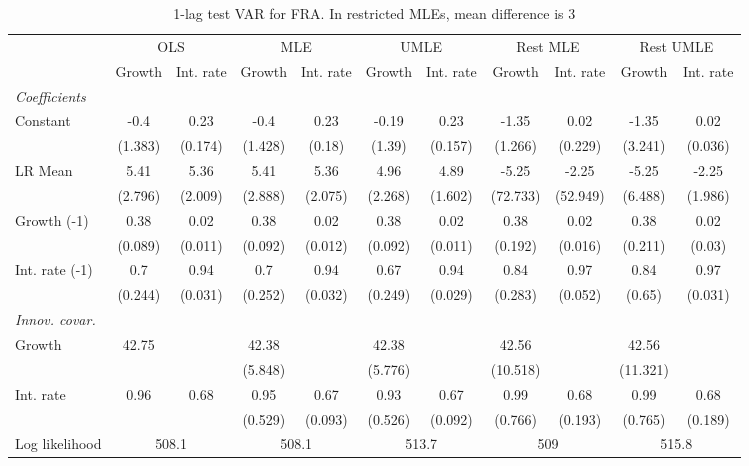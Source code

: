 \begin{table}[htbp] 
	\centering
	\begin{tabular}{@{\extracolsep{4pt}}lcccccccccc@{}}		\hline\hline
		 		 & \multicolumn{2}{c}{OLS} &\multicolumn{2}{c}{MLE} &\multicolumn{2}{c}{UMLE} &\multicolumn{2}{c}{Rest MLE} &\multicolumn{2}{c}{Rest UMLE} \\ 
 		 & Growth 	 & Int. rate 	 & Growth 	 & Int. rate 	 & Growth 	 & Int. rate 	 & Growth 	 & Int. rate 	 & Growth 	 & Int. rate\\\cline{2-3}\cline{4-5}\cline{6-7}\cline{8-9}\cline{10-11}
\rule{0pt}{4ex} 
 \emph{Coefficients} 	  		 & 		 & 		 & 		 & 		 & 		 & 		 & 		 & 		 & 		 &\\ 
\quad Constant 	 & -0.4 	 & 0.23 	 & -0.4 	 & 0.23 	 & -0.19 	 & 0.23 	 & -1.35 	 & 0.02 	 & -1.35 	 & 0.02	 \\ 
 		 & (1.383) 	 & (0.174) 	 & (1.428) 	 & (0.18) 	 & (1.39) 	 & (0.157) 	 & (1.266) 	 & (0.229) 	 & (3.241) 	 & (0.036) 	 \\ 
\quad LR Mean 	 & 5.41 	 & 5.36 	 & 5.41 	 & 5.36 	 & 4.96 	 & 4.89 	 & -5.25 	 & -2.25 	 & -5.25 	 & -2.25	 \\ 
 		 & (2.796) 	 & (2.009) 	 & (2.888) 	 & (2.075) 	 & (2.268) 	 & (1.602) 	 & (72.733) 	 & (52.949) 	 & (6.488) 	 & (1.986) 	 \\ 
\quad Growth (-1) 	 &0.38 	 & 0.02 	 & 0.38 	 & 0.02 	 & 0.38 	 & 0.02 	 & 0.38 	 & 0.02 	 & 0.38 	 & 0.02	 \\ 
 		 & (0.089) 	 & (0.011) 	 & (0.092) 	 & (0.012) 	 & (0.092) 	 & (0.011) 	 & (0.192) 	 & (0.016) 	 & (0.211) 	 & (0.03) 	 \\ 
\quad Int. rate (-1) 	 &0.7 	 & 0.94 	 & 0.7 	 & 0.94 	 & 0.67 	 & 0.94 	 & 0.84 	 & 0.97 	 & 0.84 	 & 0.97	 \\ 
 		 & (0.244) 	 & (0.031) 	 & (0.252) 	 & (0.032) 	 & (0.249) 	 & (0.029) 	 & (0.283) 	 & (0.052) 	 & (0.65) 	 & (0.031) 	 \\ 
\rule{0pt}{4ex} \emph{Innov. covar.}  	 & 	 & 	 & 	 & 	 & 	 & 	 & 	 & 	 & 	 &\\ 
\quad Growth 	 &42.75 	 &  	 & 42.38 	 &  	 & 42.38 	 &  	 & 42.56 	 &  	 & 42.56 	 & 	 \\ 
 		 &  	 &  	 & (5.848) 	 &  	 & (5.776) 	 &  	 & (10.518) 	 &  	 & (11.321) 	 &  	 \\ 
\quad Int. rate 	 &0.96 	 & 0.68 	 & 0.95 	 & 0.67 	 & 0.93 	 & 0.67 	 & 0.99 	 & 0.68 	 & 0.99 	 & 0.68	 \\ 
 		 &  	 &  	 & (0.529) 	 & (0.093) 	 & (0.526) 	 & (0.092) 	 & (0.766) 	 & (0.193) 	 & (0.765) 	 & (0.189) 	 \\ 
 \hline \rule{0pt}{4ex} 
  Log likelihood 	 &\multicolumn{2}{c}{508.1} 	 & \multicolumn{2}{c}{508.1} 	 & \multicolumn{2}{c}{513.7} 	 & \multicolumn{2}{c}{509} 	 & \multicolumn{2}{c}{515.8}\\ 

 \hline 	\end{tabular}		\caption{1-lag test VAR for FRA. In restricted MLEs, mean difference is 3}
		\label{tab:FRA1}

\end{table}